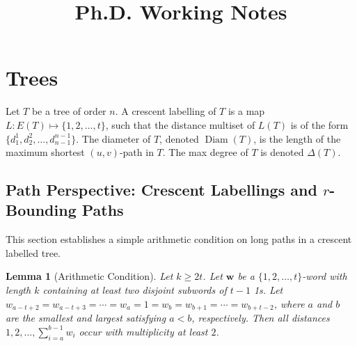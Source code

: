 \documentclass[12]{article}
\title{ \vspace{-3cm} Ph.D. Working Notes }
\DeclareMathOperator{\diam}{Diam}
\newtheorem{lem}{Lemma} %
\theoremstyle{definition}
\begin{document}
	\maketitle
	
	\section{Trees}
	
	Let $T$ be a tree of order $n$.  A crescent labelling of $T$ is a map $L: E(T) \mapsto \{1,2, \ldots, t\}$, such that the distance multiset of $L(T)$ is of the form $\{d_1^1,d_2^2, \ldots, d_{n-1}^{n-1}\}$.  The diameter of $T$, denoted $\diam(T)$, is the length of the maximum shortest $(u,v)$-path in $T$.  The max degree of $T$ is denoted $\Delta(T)$.  %
	
	\subsection{Path Perspective: Crescent Labellings and $r$-Bounding Paths}
	
	
	
	This section establishes a simple arithmetic condition on long paths in a crescent labelled tree.
	
	\begin{lem}[Arithmetic Condition]\label{Lemma-ArithmeticCondition}
		Let $k \geq 2t$.  Let $\mathbf{w}$ be a $\{1,2,\ldots, t\}$-word with length $k$ containing at least two disjoint subwords of $t-1$ 1s.  Let $w_{a-t+2} = w_{a-t+3} = \cdots = w_{a} = 1 = w_b = w_{b+1} = \cdots = w_{b+t-2}$, where $a$ and $b$ are the smallest and largest satisfying $a<b$, respectively.  Then all distances $1,2, \ldots, \sum_{i = a}^{b-1}w_i$ occur with multiplicity at least $2$.
	\end{lem}
\end{document}
